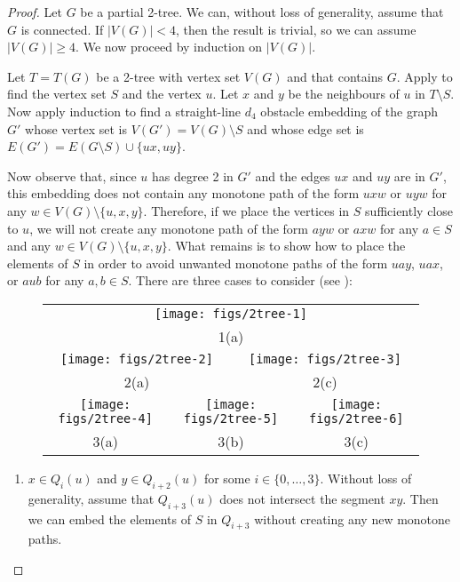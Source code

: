 \documentclass{patmorin}
\begin{document}
\begin{proof}
  Let $G$ be a partial 2-tree. We can, without loss of generality, assume
  that $G$ is connected.  If $|V(G)|< 4$, then the result is trivial, so
  we can assume $|V(G)|\ge 4$.  We now proceed by induction on $|V(G)|$.

  Let $T=T(G)$ be a 2-tree with vertex set $V(G)$ and that contains $G$.
  Apply  to find the vertex set $S$ and the vertex $u$.
  Let $x$ and $y$ be the neighbours of $u$ in $T\setminus S$. Now apply
  induction to find a straight-line $d_4$ obstacle embedding of the
  graph $G'$ whose vertex set is $V(G')=V(G)\setminus S$ and whose edge
  set is $E(G')=E(G\setminus S)\cup\{ux,uy\}$.

  Now observe that, since $u$ has degree 2 in $G'$ and the edges $ux$
  and $uy$ are in $G'$, this embedding does not contain any monotone path
  of the form $uxw$ or $uyw$ for any $w\in V(G)\setminus\{u,x,y\}$.
  Therefore, if we place the vertices in $S$ sufficiently close to $u$,
  we will not create any monotone path of the form $ayw$ or $axw$ for
  any $a\in S$ and any $w\in V(G)\setminus \{u,x,y\}$.  What remains
  is to show how to place the elements of $S$ in order to avoid unwanted
  monotone paths of the form $uay$, $uax$, or $aub$ for any $a,b\in S$.
  There are three cases to consider (see ):

  \begin{figure}
    \begin{tabular}{cccccc}
       \multicolumn{6}{c}{\texttt{[image: figs/2tree-1]}} \\
       \multicolumn{6}{c}{1(a)} \\
       \multicolumn{3}{c}{\texttt{[image: figs/2tree-2]}} & 
       \multicolumn{3}{c}{\texttt{[image: figs/2tree-3]}} \\
       \multicolumn{3}{c}{2(a)} &
       \multicolumn{3}{c}{2(c)} \\
       \multicolumn{2}{c}{\texttt{[image: figs/2tree-4]}} &
       \multicolumn{2}{c}{\texttt{[image: figs/2tree-5]}} &
       \multicolumn{2}{c}{\texttt{[image: figs/2tree-6]}} \\
       \multicolumn{2}{c}{3(a)} &
       \multicolumn{2}{c}{3(b)} &
       \multicolumn{2}{c}{3(c)} 
    \end{tabular}
  \end{figure}
  
  \begin{enumerate}

  \item  $x\in Q_i(u)$ and $y\in Q_{i+2}(u)$ for some
  $i\in\{0,\ldots,3\}$. Without loss of generality, assume that
  $Q_{i+3}(u)$ does not intersect the segment $xy$. Then we can embed the
  elements of $S$ in $Q_{i+3}$ without creating any new monotone paths.


\end{enumerate}
\end{proof}
\end{document}
